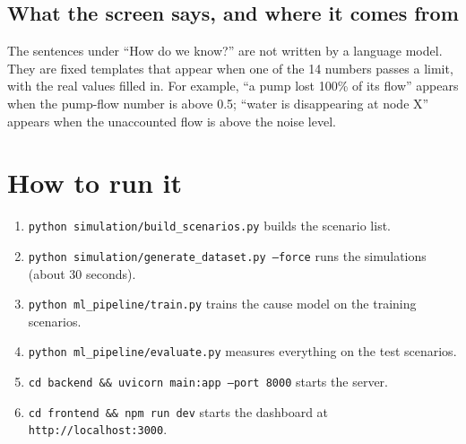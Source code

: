 \documentclass[11pt,a4paper]{article}
\newcommand{\code}[1]{\texttt{#1}}
\begin{document}
\subsection{What the screen says, and where it comes from}
The sentences under ``How do we know?'' are not written by a language model. They are fixed templates that appear when one of the 14 numbers passes a limit, with the real values filled in. For example, ``a pump lost 100\% of its flow'' appears when the pump-flow number is above 0.5; ``water is disappearing at node X'' appears when the unaccounted flow is above the noise level.

\section{How to run it}
\begin{enumerate}[itemsep=2pt]
\item \code{python simulation/build\_scenarios.py} builds the scenario list.
\item \code{python simulation/generate\_dataset.py --force} runs the simulations (about 30 seconds).
\item \code{python ml\_pipeline/train.py} trains the cause model on the training scenarios.
\item \code{python ml\_pipeline/evaluate.py} measures everything on the test scenarios.
\item \code{cd backend \&\& uvicorn main:app --port 8000} starts the server.
\item \code{cd frontend \&\& npm run dev} starts the dashboard at \code{http://localhost:3000}.
\end{enumerate}
\end{document}
